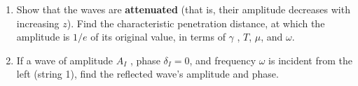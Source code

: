 \documentclass[fleqn]{article}
\begin{document}
\begin{enumerate}
\begin{enumerate}

      \item Show that the waves are \textbf{attenuated} (that is, their amplitude decreases with increasing $z$). Find the characteristic penetration distance, at which the amplitude
      is $1/e$ of its original value, in terms of $\gamma$ , $T$, $\mu$, and $\omega$.


      \item If a wave of amplitude $A_I$ , phase $\delta_I=0$, and frequency $\omega$ is incident from the left (string 1), find the reflected wave’s
      amplitude and phase.


    \end{enumerate}


  \end{enumerate}
\end{document}
